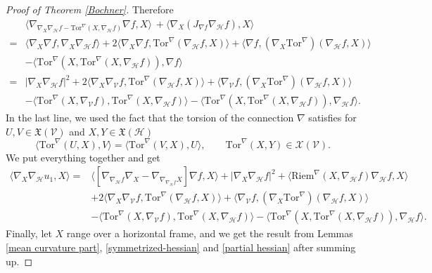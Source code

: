 \documentclass[10pt,a4paper]{amsart}
\newcommand{\Ho}{\mathcal H}
\newcommand{\Tor}{\mathrm{Tor}}
\newcommand{\V}{\mathcal V}
\begin{document}
\begin{proof}[Proof of Theorem \ref{Bochner}]
		Therefore
		\begin{align*}
			& \langle \nabla_{\nabla_X \nabla_\mathcal{H}f-\Tor^{\nabla}(X, \nabla_\mathcal{H}f) } \nabla f, X \rangle\
			+\langle \nabla_X (J_{\nabla f}\nabla_\mathcal{H}f), X \rangle \\
			=&\langle \nabla_{X} \nabla f, \nabla_X \nabla_\mathcal{H}f  \rangle+2\langle \nabla_X \nabla f, \Tor^\nabla(\nabla_{\mathcal{H}}f, X) \rangle+\langle \nabla f, (\nabla_X \Tor^\nabla)(\nabla_{\mathcal{H}}f, X) \rangle \\
			&-\langle \Tor^\nabla(X, \Tor^{\nabla}(X, \nabla_\mathcal{H}f) ), \nabla f \rangle \\
			=&|\nabla_X \nabla_\mathcal{H}f  |^2+2\langle \nabla_X \nabla_\V f, \Tor^\nabla(\nabla_{\mathcal{H}}f, X) \rangle+\langle \nabla_\V f, (\nabla_X \Tor^\nabla)(\nabla_{\mathcal{H}}f, X) \rangle \\
			&-\langle \Tor^{\nabla}(X, \nabla_\mathcal{V}f) ,\Tor^{\nabla}(X, \nabla_\mathcal{H}f)\rangle-\langle \Tor^\nabla(X, \Tor^{\nabla}(X, \nabla_\mathcal{H}f) ), \nabla_\Ho f \rangle.
		\end{align*}
		In the last line, we used the fact that the torsion of the connection $\nabla$ satisfies for $U,V \in\mathfrak{X}(\V)$ and $X,Y \in \mathfrak{X}(\Ho)$
		\[
		\langle \Tor^\nabla (U,X),V \rangle=\langle \Tor^\nabla (V,X),U \rangle, \qquad \Tor^\nabla (X,Y) \in \mathcal{X}(\V).
		\]
		We put everything together and get		
		\begin{align*}
			\langle \nabla_X \nabla_{\mathcal{H}}u_1 ,X \rangle=&\langle[\nabla_{\nabla_\mathcal{H}f} \nabla_X-\nabla_{\nabla_{\nabla_\mathcal{H}f} X}] \nabla f, X \rangle +|\nabla_X \nabla_\mathcal{H}f  |^2+\langle\mathrm{Riem}^{\nabla}(X, \nabla_{\mathcal{H}} f) \nabla_\Ho f, X\rangle \\
			&+2\langle \nabla_X \nabla_\V f, \Tor^\nabla(\nabla_{\mathcal{H}}f, X) \rangle+\langle \nabla_\V f, (\nabla_X \Tor^\nabla)(\nabla_{\mathcal{H}}f, X) \rangle \\
			& -\langle \Tor^{\nabla}(X, \nabla_\mathcal{V}f) ,\Tor^{\nabla}(X, \nabla_\mathcal{H}f)\rangle-\langle \Tor^\nabla(X, \Tor^{\nabla}(X, \nabla_\mathcal{H}f) ), \nabla_\Ho f \rangle.
		\end{align*}
		Finally, let $X$ range over a horizontal frame, and we get the result  from Lemmas \ref{mean curvature part}, \ref{symmetrized-hessian} and \ref{partial hessian} after summing up. 
        

\end{proof}
\end{document}
